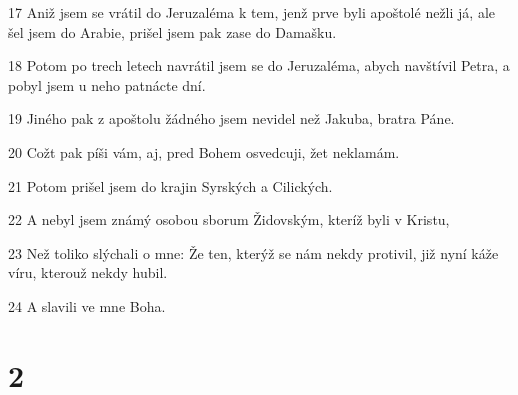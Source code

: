\par 17 Aniž jsem se vrátil do Jeruzaléma k tem, jenž prve byli apoštolé nežli já, ale šel jsem do Arabie, prišel jsem pak zase do Damašku.
\par 18 Potom po trech letech navrátil jsem se do Jeruzaléma, abych navštívil Petra, a pobyl jsem u neho patnácte dní.
\par 19 Jiného pak z apoštolu žádného jsem nevidel než Jakuba, bratra Páne.
\par 20 Cožt pak píši vám, aj, pred Bohem osvedcuji, žet neklamám.
\par 21 Potom prišel jsem do krajin Syrských a Cilických.
\par 22 A nebyl jsem známý osobou sborum Židovským, kteríž byli v Kristu,
\par 23 Než toliko slýchali o mne: Že ten, kterýž se nám nekdy protivil, již nyní káže víru, kterouž nekdy hubil.
\par 24 A slavili ve mne Boha.

\chapter{2}


